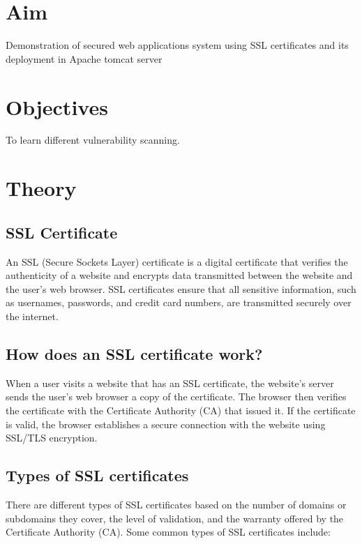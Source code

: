 \documentclass[11pt]{article}
\begin{document}
\tableofcontents
\thispagestyle{empty}
\clearpage

\setcounter{page}{1}

\section{Aim}

Demonstration of secured web applications system using SSL certificates and its
deployment in Apache tomcat server

\section{Objectives}
To learn different vulnerability scanning.

\section{Theory}

\subsection{SSL Certificate}
An SSL (Secure Sockets Layer) certificate is a digital certificate that verifies the authenticity of a website and encrypts data transmitted between the website and the user's web browser. SSL certificates ensure that all sensitive information, such as usernames, passwords, and credit card numbers, are transmitted securely over the internet.

\subsection{How does an SSL certificate work?}
When a user visits a website that has an SSL certificate, the website's server sends the user's web browser a copy of the certificate. The browser then verifies the certificate with the Certificate Authority (CA) that issued it. If the certificate is valid, the browser establishes a secure connection with the website using SSL/TLS encryption.

\subsection{Types of SSL certificates}
There are different types of SSL certificates based on the number of domains or subdomains they cover, the level of validation, and the warranty offered by the Certificate Authority (CA). Some common types of SSL certificates include:
\end{document}

